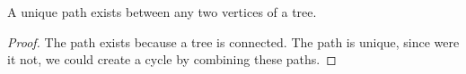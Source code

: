 \begin{prop}

A unique path exists between any two vertices of a tree.

\begin{proof}
The path exists because a tree is connected.
The path is unique, since were it not, we could create a cycle by combining these paths.
\end{proof}

\end{prop}
\strats
